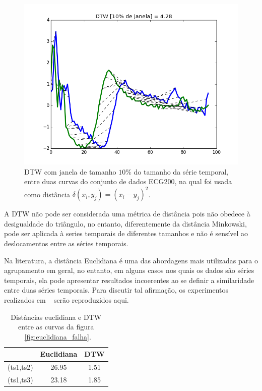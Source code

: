 \begin{figure}
			\centering
			\includegraphics[width=.95\linewidth]{figuras/ECG200_dtw_10_window.png}
			\caption{DTW com janela de tamanho $10\%$ do tamanho da série temporal, entre duas curvas do conjunto de dados ECG200, na qual foi usada como distância $\delta(x_i,y_j) = (x_i-y_j)^2$.}
			\label{fig:sfig3}
	\label{fig:dtw_compare}
\end{figure}

A DTW não pode ser considerada uma métrica de distância pois não obedece à desigualdade do triângulo, no entanto, diferentemente da distância Minkowski, pode ser aplicada à series temporais de diferentes tamanhos e não é sensível ao deslocamentos entre as séries temporais.

Na literatura, a distância Euclidiana é uma das abordagens mais utilizadas para o agrupamento em geral, no entanto, em alguns casos nos quais os dados são séries temporais, ela pode apresentar resultados incoerentes ao se definir a similaridade entre duas séries temporais. Para discutir tal afirmação, os experimentos realizados em ~\parencite{FalhaEuclideana} serão reproduzidos aqui. 

\begin{table}[!h]
	\centering
	\caption{Distâncias euclidiana e DTW entre as curvas da figura ~\ref{fig:euclidiana_falha}.}
	\label{euclidiana_vs_DTW}
	\begin{tabular}{|c|c|c|}
			\hline
										 				& Euclidiana& DTW\\ 
			\hline
		(ts1,ts2) 	& 26.95 	& 1.51 \\
					\hline					
		(ts1,ts3) 			& 23.18 	& 1.85 \\
					\hline
	\end{tabular}
\end{table}

